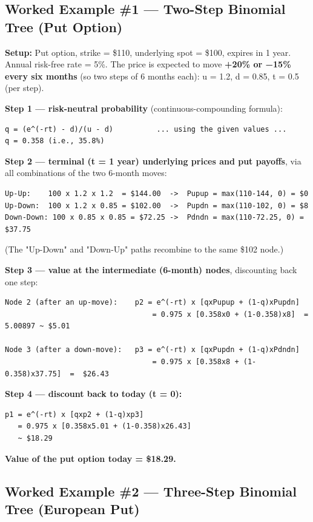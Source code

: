 \documentclass[12pt,openany]{book}
\theoremstyle{definition}
\theoremstyle{remark}
\begin{document}
\subsection{Worked Example \#1 — Two-Step Binomial Tree (Put Option)}

\textbf{Setup:} Put option, strike = \$110, underlying spot = \$100, expires in 1 year. Annual risk-free rate = 5\%. The price is expected to move \textbf{+20\% or −15\% every six months} (so two steps of 6 months each): u = 1.2, d = 0.85, t = 0.5 (per step).

\textbf{Step 1 — risk-neutral probability} (continuous-compounding formula):
\begin{lstlisting}[style=notesCode]
q = (e^(-rt) - d)/(u - d)          ... using the given values ...
q = 0.358 (i.e., 35.8%)
\end{lstlisting}

\textbf{Step 2 — terminal (t = 1 year) underlying prices and put payoffs}, via all combinations of the two 6-month moves:
\begin{lstlisting}[style=notesCode]
Up-Up:    100 x 1.2 x 1.2  = $144.00  ->  Pupup = max(110-144, 0) = $0
Up-Down:  100 x 1.2 x 0.85 = $102.00  ->  Pupdn = max(110-102, 0) = $8
Down-Down: 100 x 0.85 x 0.85 = $72.25 ->  Pdndn = max(110-72.25, 0) = $37.75
\end{lstlisting}
(The "Up-Down" and "Down-Up" paths recombine to the same \$102 node.)

\textbf{Step 3 — value at the intermediate (6-month) nodes}, discounting back one step:
\begin{lstlisting}[style=notesCode]
Node 2 (after an up-move):    p2 = e^(-rt) x [qxPupup + (1-q)xPupdn]
                                  = 0.975 x [0.358x0 + (1-0.358)x8]  =  5.00897 ~ $5.01

Node 3 (after a down-move):   p3 = e^(-rt) x [qxPupdn + (1-q)xPdndn]
                                  = 0.975 x [0.358x8 + (1-0.358)x37.75]  =  $26.43
\end{lstlisting}

\textbf{Step 4 — discount back to today (t = 0):}
\begin{lstlisting}[style=notesCode]
p1 = e^(-rt) x [qxp2 + (1-q)xp3]
   = 0.975 x [0.358x5.01 + (1-0.358)x26.43]
   ~ $18.29
\end{lstlisting}

\textbf{Value of the put option today = \$18.29.}

\subsection{Worked Example \#2 — Three-Step Binomial Tree (European Put)}
\end{document}
